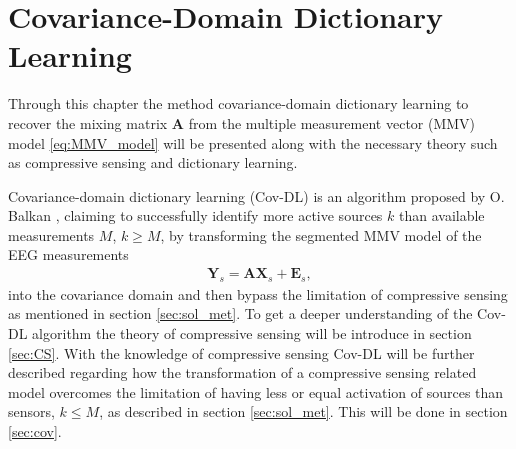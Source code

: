 \chapter{Covariance-Domain Dictionary \\ Learning}\label{ch:Cov-DL}
Through this chapter the method covariance-domain dictionary learning to recover the mixing matrix $\mathbf{A}$ from the multiple measurement vector (MMV) model \eqref{eq:MMV_model} will be presented along with the necessary theory such as compressive sensing and dictionary learning.

Covariance-domain dictionary learning (Cov-DL) is an algorithm proposed by O. Balkan \cite{Balkan2015}, claiming to successfully identify more active sources $k$ than available measurements $M$, $k \geq M$, by transforming the segmented MMV model of the EEG measurements
\begin{align*}
\mathbf{Y}_s = \mathbf{A} \mathbf{X}_s + \textbf{E}_s,
\end{align*}
into the covariance domain and then bypass the limitation of compressive sensing as mentioned in section \ref{sec:sol_met}. 
To get a deeper understanding of the Cov-DL algorithm the theory of compressive sensing will be introduce in section \ref{sec:CS}. 
With the knowledge of compressive sensing Cov-DL will be further described regarding how the transformation of a compressive sensing related model overcomes the limitation of having less or equal activation of sources than sensors, $k \leq M$, as described in section \ref{sec:sol_met}. This will be done in section \ref{sec:cov}.




